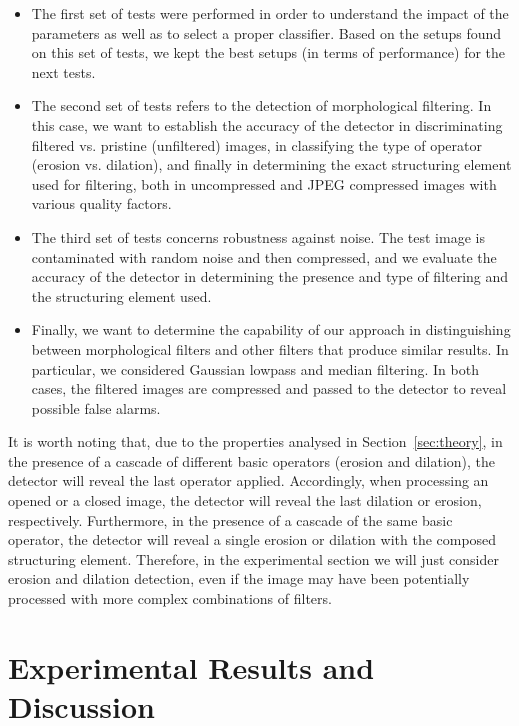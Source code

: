 \documentclass[review]{elsarticle}
\begin{document}
\begin{itemize}
\item The first set of tests were performed in order to understand the impact of the parameters as well as to select a proper classifier. Based on the setups found on this set of tests, we kept the best setups (in terms of performance) for the next tests.

\item The second set of tests refers to the detection of morphological filtering. In this case, we want to establish the accuracy of the detector in discriminating filtered vs. pristine (unfiltered) images, in classifying the type of operator (erosion vs. dilation), and finally in determining the exact structuring element used for filtering, both in uncompressed and JPEG compressed images with various quality factors. 

\item The third set of tests concerns robustness against noise. The test image is contaminated with random noise and then compressed, and we evaluate the accuracy of the detector in determining the presence and type of filtering and the structuring element used.

\item Finally, we want to determine the capability of our approach in distinguishing between morphological filters and other filters that produce similar results. In particular, we considered Gaussian lowpass and median filtering. In both cases, the filtered images are compressed and passed to the detector to reveal possible false alarms.
	
\end{itemize}

It is worth noting that, due to the properties analysed in Section~\ref{sec:theory}, in the presence of a cascade of different basic operators (erosion and dilation), the detector will reveal the last operator applied. Accordingly, when processing an opened or a closed image, the detector will reveal the last dilation or erosion, respectively. Furthermore, in the presence of a cascade of the same basic operator, the detector will reveal a single erosion or dilation with the composed structuring element. Therefore, in the experimental section we will just consider erosion and dilation detection, even if the image may have been potentially processed with more complex combinations of filters.


\section{Experimental Results and Discussion}
\label{sec:experiments}
\end{document}
